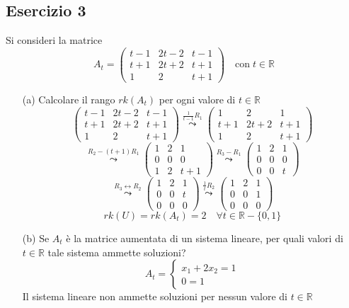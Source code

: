 \documentclass[a4paper]{article}
\theoremstyle{break}
\theoremstyle{break}
\theoremstyle{break}
\theoremstyle{break}
\begin{document}
\subsection{Esercizio 3}
Si consideri la matrice
\[
	A_t = \begin{pmatrix}
		t-1 & 2t-2 & t-1 \\
		t+1 & 2t+2 & t+1 \\
		1   & 2    & t+1
	\end{pmatrix}
	\quad
	\text{con} \; t \in \mathbb{R}
\]
\begin{enumerate}
	\item[(a)] Calcolare il rango \( rk(A_t) \) per ogni valore di \( t \in \mathbb{R} \)
	      \[
		      \begin{pmatrix}
			      t-1 & 2t-2 & t-1 \\
			      t+1 & 2t+2 & t+1 \\
			      1   & 2    & t+1
		      \end{pmatrix}
		      \stackrel{\frac{1}{t-1}R_1}{\leadsto}
		      \begin{pmatrix}
			      1   & 2    & 1   \\
			      t+1 & 2t+2 & t+1 \\
			      1   & 2    & t+1
		      \end{pmatrix}
	      \]
	      \[
		      \stackrel{R_2 - (t+1)R_1}{\leadsto}
		      \begin{pmatrix}
			      1 & 2 & 1   \\
			      0 & 0 & 0   \\
			      1 & 2 & t+1
		      \end{pmatrix}
		      \stackrel{R_3 - R_1}{\leadsto}
		      \begin{pmatrix}
			      1 & 2 & 1 \\
			      0 & 0 & 0 \\
			      0 & 0 & t
		      \end{pmatrix}
	      \]
	      \[
		      \stackrel{R_3 \leftrightarrow R_2}{\leadsto}
		      \begin{pmatrix}
			      1 & 2 & 1 \\
			      0 & 0 & t \\
			      0 & 0 & 0
		      \end{pmatrix}
		      \stackrel{\frac{1}{t}R_2}{\leadsto}
		      \begin{pmatrix}
			      1 & 2 & 1 \\
			      0 & 0 & 1 \\
			      0 & 0 & 0
		      \end{pmatrix}
	      \]
	      \[
		      rk(U) = rk(A_t) = 2 \quad \forall t \in \mathbb{R} - \{0, 1\}
	      \]
	\item[(b)] Se \( A_t \) è la matrice aumentata di un sistema lineare, per quali valori
	      di \( t \in \mathbb{R} \)  tale sistema ammette soluzioni?
	      \[
		      A_t = \begin{cases}
			      x_1 + 2x_2 = 1 \\
			      0 = 1
		      \end{cases}
	      \]
	      Il sistema lineare non ammette soluzioni per nessun valore di \( t \in \mathbb{R} \)
\end{enumerate}
\end{document}
